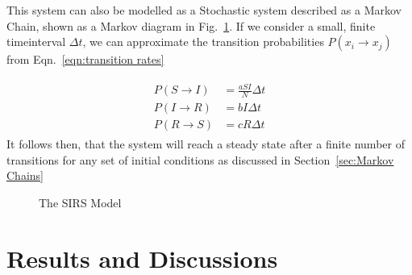 \documentclass[10pt,showpacs,preprintnumbers,amsmath,amssymb,nofootinbib,aps,prl,twocolumn,groupedaddress,superscriptaddress,showkeys]{revtex4-1}
\begin{document}
    This system can also be modelled as a Stochastic system described as a Markov Chain, shown as a Markov diagram in Fig.~\ref{fig:SIRS diagram}. If we consider a small, finite timeinterval $\Delta t$, we can approximate the transition probabilities $P(x_i \rightarrow x_j)$ from Eqn.~\ref{eqn:transition rates}

    \begin{align}
      \begin{split}
        P(S\rightarrow I) &= \frac{aSI}{N}\Delta t
          \\
        P(I\rightarrow R) &= bI\Delta t
          \\
        P(R\rightarrow S) &= cR\Delta t
      \end{split}
    \end{align}
    It follows then, that the system will reach a steady state after a finite number of transitions for any set of initial conditions as discussed in Section~\ref{sec:Markov Chains}

    \begin{figure}[h!tb]
      \centering 
       \caption{The SIRS Model\label{fig:SIRS diagram}}
    \end{figure}


\section{Results and Discussions}
\end{document}
